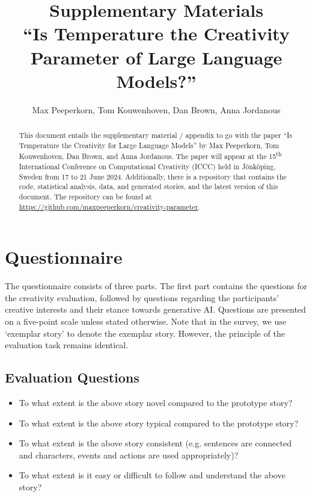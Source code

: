 \documentclass[a4paper]{article}
\title{%
Supplementary Materials \\ 
``Is Temperature the Creativity Parameter of Large Language Models?''}
\author{Max Peeperkorn, Tom Kouwenhoven, Dan Brown, Anna Jordanous}
\begin{document}
\maketitle

\begin{abstract}
This document entails the supplementary material / appendix to go with the paper ``Is Temperature the Creativity for Large Language Models'' by Max Peeperkorn, Tom Kouwenhoven, Dan Brown, and Anna Jordanous. The paper will appear at the 15\textsuperscript{th} International Conference on Computational Creativity (ICCC) held in J\"onk\"oping, Sweden from 17 to 21 June 2024. Additionally, there is a repository that contains the code, statistical analysis, data, and generated stories, and the latest version of this document. The repository can be found at \url{https://github.com/maxpeeperkorn/creativity-parameter}.
\end{abstract}
    
\appendix

\section{Questionnaire}\label{app:questionnaire}
The questionnaire consists of three parts. The first part contains the questions for the creativity evaluation, followed by questions regarding the participants' creative interests and their stance towards generative AI.
Questions are presented on a five-point scale unless stated otherwise.
Note that in the survey, we use `exemplar story' to denote the exemplar story. However, the principle of the evaluation task remains identical.

\subsection*{Evaluation Questions}
\begin{itemize}
    \item To what extent is the above story novel compared to the prototype story?
    \item To what extent is the above story typical compared to the prototype story?
    \item To what extent is the above story consistent (e.g. sentences are connected and characters, events and actions are used appropriately)?
    \item To what extent is it easy or difficult to follow and understand the above story?
\end{itemize}
\end{document}
